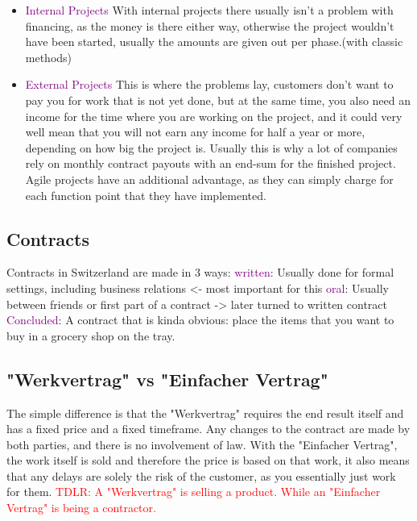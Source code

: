 \documentclass[main.tex,fontsize=12pt,paper=a4,paper=landscape,DIV=calc,]{scrartcl}
\begin{document}
\begin{multicols*}{2}
\begin{itemize}
\item \textcolor{purple}{Internal Projects}\newline
  With internal projects there usually isn't a problem with financing, as the money is there either way, otherwise the project wouldn't have been started, usually the amounts are given out per phase.(with classic methods)
\item \textcolor{purple}{External Projects}\newline
  This is where the problems lay, customers don't want to pay you for work that is not yet done, but at the same time, you also need an income for the time where you are working on the project, and it could very well mean that you will not earn any income for half a year or more, depending on how big the project is.\newline
  Usually this is why a lot of companies rely on monthly contract payouts with an end-sum for the finished project.\newline
  Agile projects have an additional advantage, as they can simply charge for each function point that they have implemented.
\end{itemize} 

\subsection{Contracts}
Contracts in Switzerland are made in 3 ways:\newline
\textcolor{purple}{written}: \newline
Usually done for formal settings, including business relations <- most important for this \newline
\textcolor{purple}{oral}:\newline
Usually between friends or first part of a contract -> later turned to written contract\newline
\textcolor{purple}{Concluded}:\newline
A contract that is kinda obvious: place the items that you want to buy in a grocery shop on the tray.

\subsection{"Werkvertrag" vs "Einfacher Vertrag"} 
The simple difference is that the "Werkvertrag" requires the end result itself and has a fixed price and a fixed timeframe.\newline
Any changes to the contract are made by both parties, and there is no involvement of law.\newline
With the "Einfacher Vertrag", the work itself is sold and therefore the price is based on that work, it also means that any delays are solely the risk of the customer, as you essentially just work for them.\newline
\textcolor{red}{TDLR: A "Werkvertrag" is selling a product. While an "Einfacher Vertrag" is being a contractor.}


\end{multicols*}
\end{document}
